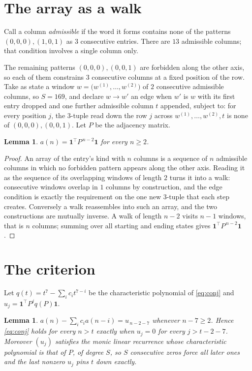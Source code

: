 \documentclass[11pt,a4paper]{article}
\theoremstyle{plain}
\newtheorem{lemma}[theorem]{Lemma}
\theoremstyle{definition}
\begin{document}
\section{The array as a walk}

Call a column \emph{admissible} if the word it forms contains none of the patterns
$(0,0,0), (1,0,1)$ as $3$ consecutive entries. There are $13$ admissible columns; that condition
involves a single column only.

The remaining patterns $(0,0,0), (0,0,1)$ are forbidden along the other axis, so each of them
constrains $3$ consecutive columns at a fixed position of the row. Take as state a
window $w=\bigl(w^{(1)},\dots,w^{(2)}\bigr)$ of $2$ consecutive admissible
columns, so $S=169$, and declare $w\to w'$ an edge when $w'$ is $w$ with its first entry
dropped and one further admissible column $t$ appended, subject to: for every position
$j$, the $3$-tuple read down the row $j$ across $w^{(1)},\dots,w^{(2)},t$
is none of $(0,0,0), (0,0,1)$. Let $P$ be the adjacency matrix.

\begin{lemma}\label{lem:walk}
$a(n)=\mathbf{1}^{\!\top}P^{\,n-2}\mathbf{1}$ for every $n\ge2$.
\end{lemma}

\begin{proof}
An array of the entry's kind with $n$ columns is a sequence of $n$ admissible columns in
which no forbidden pattern appears along the other axis. Reading it as the sequence of its
overlapping windows of length $2$ turns it into a walk: consecutive windows overlap in
$1$ columns by construction, and the edge condition is exactly the requirement on the one
new $3$-tuple that each step creates. Conversely a walk reassembles into such an array,
and the two constructions are mutually inverse. A walk of length $n-2$ visits $n-1$
windows, that is $n$ columns; summing over all starting and ending states gives
$\mathbf{1}^{\!\top}P^{\,n-2}\mathbf{1}$.
\end{proof}

\section{The criterion}

Let $q(t)=t^{7}-\sum_i c_i t^{7-i}$ be the characteristic polynomial of
\eqref{eq:conj} and $u_j=\mathbf{1}^{\!\top}P^{j}q(P)\mathbf{1}$.

\begin{lemma}\label{lem:crit}
$a(n)-\sum_i c_i a(n-i)=u_{\,n-2-7}$ whenever $n-7\ge2$. Hence
\eqref{eq:conj} holds for every $n>t$ exactly when $u_j=0$ for every
$j>t-2-7$. Moreover $(u_j)$ satisfies the monic linear recurrence whose
characteristic polynomial is that of $P$, of degree $S$, so $S$ consecutive zeros force all
later ones and the last nonzero $u_j$ pins $t$ down exactly.
\end{lemma}
\end{document}
